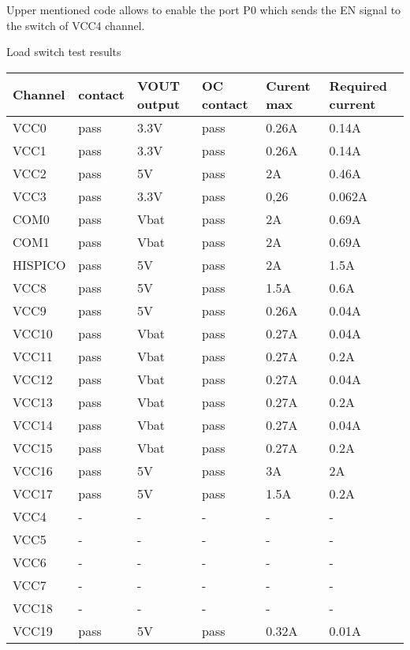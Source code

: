 	Upper mentioned code allows to enable the port P0 which sends the EN signal to the switch of VCC4 channel.
	
		\caption{Load switch test results}
		
		
		
		\begin{tabular}{p{2cm}p{2cm}p{2cm}p{2cm}p{2cm}p{2cm}}
			\toprule
			
			
			Channel & contact & VOUT output & OC contact & Curent max & Required current \\ \midrule
			VCC0 & pass & 3.3V & pass & 0.26A & 0.14A  \\ 
			VCC1 & pass & 3.3V & pass & 0.26A & 0.14A  \\ 
			VCC2 & pass & 5V & pass & 2A & 0.46A  \\ 
			VCC3 & pass & 3.3V & pass & 0,26 & 0.062A \\ 
			COM0 & pass & Vbat & pass & 2A & 0.69A  \\ 
			COM1 & pass & Vbat & pass & 2A & 0.69A  \\ 
			HISPICO & pass & 5V & pass & 2A & 1.5A \\ 
			VCC8 & pass & 5V & pass & 1.5A & 0.6A \\ 
			VCC9 & pass & 5V & pass & 0.26A & 0.04A \\ 
			VCC10 & pass & Vbat & pass & 0.27A & 0.04A \\ 
			VCC11 & pass & Vbat & pass & 0.27A & 0.2A \\ 
			VCC12 & pass & Vbat & pass & 0.27A & 0.04A \\ 
			VCC13 & pass & Vbat & pass & 0.27A & 0.2A \\ 
			VCC14 & pass & Vbat & pass & 0.27A & 0.04A \\ 
			VCC15 & pass & Vbat & pass & 0.27A & 0.2A \\ 
			VCC16 & pass & 5V & pass & 3A & 2A  \\ 
			VCC17 & pass & 5V & pass & 1.5A & 0.2A  \\ 
			VCC4 &  - &  - &  - &  - &  - \\ 
			VCC5 &  - &  - &  - &  - &  - \\ 
			VCC6 &  - &  - &  - &  - &  - \\ 
			VCC7 &  - &  - &  - &  - &  - \\ 
			VCC18 &  - &  - &  - &  - &  - \\ 
			VCC19 & pass & 5V & pass & 0.32A & 0.01A \\ 
			\bottomrule
		\end{tabular}
		\label{switchtest}
	
